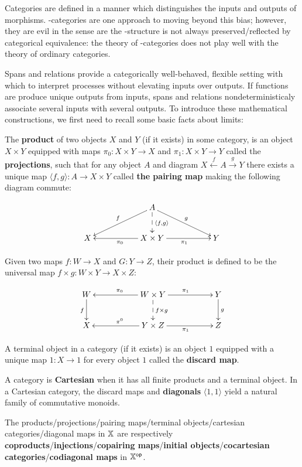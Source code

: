 Categories are defined in a manner which distinguishes the inputs and outputs of morphisms.  \dag-categories are one approach to moving beyond this bias; however, they are evil in the sense are the \dag-structure is not always preserved/reflected by categorical equivalence: the theory of \dag-categories does not play well with the theory of ordinary categories.  

Spans and relations provide a categorically well-behaved, flexible setting with which to interpret processes without elevating inputs over outputs.
If functions are produce unique outputs from inputs, spans and relations nondeterministicaly associate several inputs with several outputs.  To introduce these mathematical constructions, we first need to recall some basic facts about limits: 



\begin{definition}
The {\bf product} of two objects $X$ and $Y$ (if it exists) in some category, is an object $X\times Y$ equipped with maps $\pi_0:X\times Y\to X $ and $\pi_1:X\times Y \to Y$ called the {\bf projections},  such that for any object $A$ and diagram  $X \xleftarrow{f} A \xrightarrow{g} Y$ there exists a unique map $\langle  f, g \rangle :A \to X\times Y$ called {\bf the pairing map} making the following diagram commute:


$$
\xymatrix{
    &
    & A \ar[lld]_f \ar[rrd]^g \ar@{-->}[d]^{\langle f,g\rangle}
    &
    &
  \\X 
    &
    & X\times Y \ar[ll]^{\pi_0} \ar[rr]_{\pi_1}
    &
    & Y
}
$$ 

Given two maps $f:W\to X$ and $G:Y\to Z$, their product is defined to be the universal map $f\times g:W\times Y \to X\times Z$: 

$$
\xymatrix{
    W \ar[d]_f
    &
    & W\times Y \ar@{-->}[d]^{f\times g} \ar[ll]_{\pi_0} \ar[rr]^{\pi_1}
    &
    & Y \ar[d]^g
  \\X
    &
    & Y\times Z  \ar[ll]_{\pi^0} \ar[rr]_{\pi_1}
    &
    &Z
}
$$


A terminal object in a category (if it exists) is an object $1$ equipped with a unique map $1:X\to 1$ for every object $1$ called the {\bf discard map}.



A category is  {\bf Cartesian } when it has all finite products and a terminal object. In a Cartesian category, the discard maps and {\bf diagonals} $\langle 1, 1 \rangle$ yield a natural family of commutative monoids.


The products/projections/pairing maps/terminal objects/cartesian categories/diagonal maps in $\mathbb{X}$ are respectively {\bf coproducts}/{\bf injections}/{\bf copairing maps}/{\bf initial objects}/{\bf cocartesian categories}/{\bf codiagonal maps} in $\mathbb{X}^{\mathsf{op}}$.

\end{definition}

